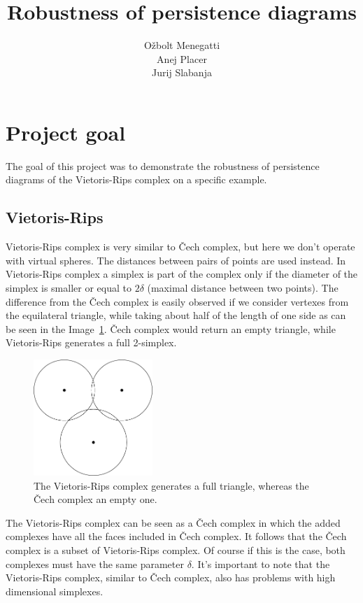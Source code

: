 \documentclass[11pt]{article}
\title{\textbf{Robustness of persistence diagrams}}
\author{O\v zbolt Menegatti\\
		Anej Placer\\
		Jurij Slabanja}
\date{}
\begin{document}
\maketitle

\section{Project goal}

The goal of this project was to demonstrate the robustness of persistence diagrams of the Vietoris-Rips complex on a specific example.

\subsection{Vietoris-Rips}
Vietoris-Rips complex is very similar to Čech complex, but here we don't operate with virtual spheres. The distances between pairs of points are used instead. In Vietoris-Rips complex a simplex is part of the complex only if the diameter of the simplex is smaller or equal to $2\delta$ (maximal distance between two points). The difference from the Čech complex is easily observed if we consider vertexes from the equilateral triangle, while taking about half of the length of one side as can be seen in the Image~\ref{fig:vrdiag}. Čech complex would return an empty triangle, while Vietoris-Rips generates a full 2-simplex.\cite{Zomorodian2010263}

\begin{figure}[!htb]
    \centering
    \includegraphics[width=0.4\textwidth]{vrdiag.png}
    \caption{The Vietoris-Rips complex generates a full triangle, whereas the Čech complex an empty one.}
    \label{fig:vrdiag}
\end{figure}

The Vietoris-Rips complex can be seen as a Čech complex in which the added complexes have all the faces included in Čech complex. It follows that the Čech complex is a subset of Vietoris-Rips complex. Of course if this is the case, both complexes must have the same parameter $\delta$. It's important to note that the Vietoris-Rips complex, similar to Čech complex, also has problems with high dimensional simplexes.
\end{document}
